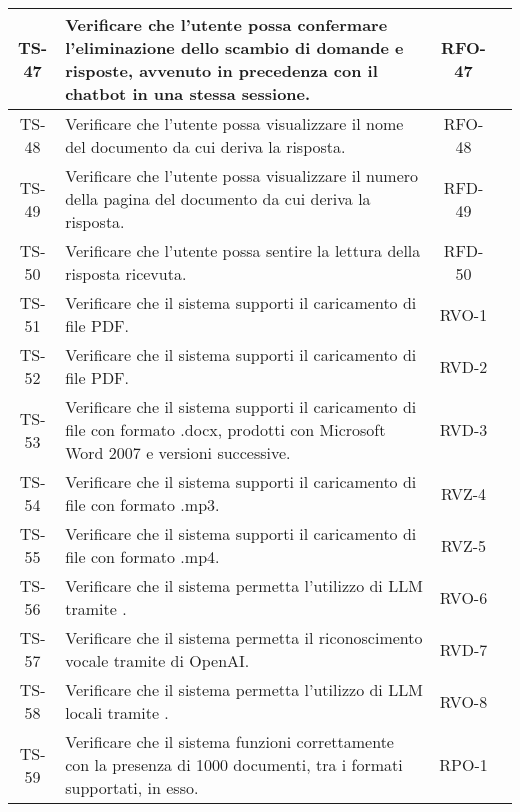 \begin{xltabular}{\textwidth}{| c | X | c | c |}
    \hline
    TS-47 & Verificare che l'utente possa confermare l'eliminazione dello scambio di domande e risposte, avvenuto in precedenza con il chatbot in una stessa sessione. & RFO-47 & \textcolor{xmarkcolor}{} \\
    \hline
    TS-48 & Verificare che l'utente possa visualizzare il nome del documento da cui deriva la risposta. & RFO-48 & \textcolor{xmarkcolor}{} \\
    \hline
    TS-49 & Verificare che l'utente possa visualizzare il numero della pagina del documento da cui deriva la risposta. & RFD-49 & \textcolor{xmarkcolor}{} \\
    \hline
    TS-50 & Verificare che l'utente possa sentire la lettura della risposta ricevuta. & RFD-50 & \textcolor{xmarkcolor}{} \\
    \hline
    TS-51 & Verificare che il sistema supporti il caricamento di file PDF. & RVO-1 & \textcolor{xmarkcolor}{} \\
    \hline
    TS-52 & Verificare che il sistema supporti il caricamento di file PDF. & RVD-2 & \textcolor{xmarkcolor}{} \\
    \hline
    TS-53 & Verificare che il sistema supporti il caricamento di file con formato .docx, prodotti con Microsoft Word 2007 e versioni successive. & RVD-3 & \textcolor{xmarkcolor}{} \\
    \hline
    TS-54 & Verificare che il sistema supporti il caricamento di file con formato .mp3. & RVZ-4 & \textcolor{xmarkcolor}{} \\
    \hline
    TS-55 & Verificare che il sistema supporti il caricamento di file con formato .mp4. & RVZ-5 & \textcolor{xmarkcolor}{} \\
    \hline
    TS-56 & Verificare che il sistema permetta l'utilizzo di LLM tramite . & RVO-6 & \textcolor{xmarkcolor}{}\\
    \hline
    TS-57 & Verificare che il sistema permetta il riconoscimento vocale tramite  di OpenAI. & RVD-7 & \textcolor{xmarkcolor}{}\\
    \hline
    TS-58 & Verificare che il sistema permetta l'utilizzo di LLM locali tramite . & RVO-8 & \textcolor{xmarkcolor}{} \\
    \hline
    TS-59 & Verificare che il sistema funzioni correttamente con la presenza di 1000 documenti, tra i formati supportati, in esso. & RPO-1 & \textcolor{xmarkcolor}{} \\

\end{xltabular}
